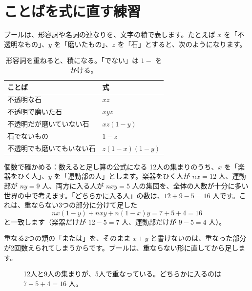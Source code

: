 \documentclass[a4paper,11pt,openany]{ltjsbook}
\begin{document}
\section{ことばを式に直す練習}

ブールは、形容詞や名詞の連なりを、文字の積で表します。たとえば $x$ を「不透明なもの」、$y$ を「磨いたもの」、$z$ を「石」とすると、次のようになります。

\begin{table}[htbp]
\centering
\begin{tabular}{ll}
\toprule
ことば & 式\\
\midrule
不透明な石 & $xz$\\
不透明で磨いた石 & $xyz$\\
不透明だが磨いていない石 & $xz(1-y)$\\
石でないもの & $1-z$\\
不透明でも磨いてもいない石 & $z(1-x)(1-y)$\\
\bottomrule
\end{tabular}
\caption{形容詞を重ねると、積になる。「でない」は $1-{}$ をかける。}
\end{table}

\begin{examplebox}{個数で確かめる：数えると足し算の公式になる}
12人の集まりのうち、$x$ を「楽器をひく人」、$y$ を「運動部の人」とします。楽器をひく人が $nx=12$ 人、運動部が $ny=9$ 人、両方に入る人が $nxy=5$ 人の集団を、全体の人数が十分に多い世界の中で考えます。「どちらかに入る人」の数は、$12+9-5=16$ 人です。これは、重ならない3つの部分に分けて足した
\[
nx(1-y)+nxy+n(1-x)y=7+5+4=16
\]
と一致します（楽器だけが $12-5=7$ 人、運動部だけが $9-5=4$ 人）。
\end{examplebox}

重なる2つの類の「または」を、そのまま $x+y$ と書けないのは、重なった部分が2回数えられてしまうからです。ブールは、重ならない形に直してから足します。

\begin{figure}[htbp]
\centering
{}
\caption{12人と9人の集まりが、5人で重なっている。どちらかに入るのは $7+5+4=16$ 人。}
\end{figure}
\end{document}
